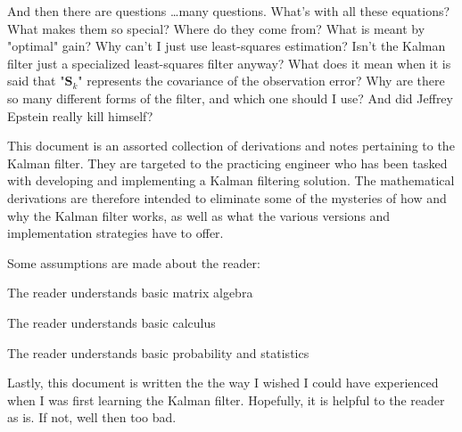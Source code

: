 And then there are questions \ldots many questions.
What’s with all these equations?
What makes them so special?
Where do they come from?
What is meant by "optimal" gain?
Why can’t I just use least-squares estimation?
Isn’t the Kalman filter just a specialized least-squares filter anyway?
What does it mean when it is said that "$\mathbf{S}_k$" represents the covariance of the observation error?
Why are there so many different forms of the filter, and which one should I use?
And did Jeffrey Epstein really kill himself?

This document is an assorted collection of derivations and notes pertaining to the Kalman
filter. They are targeted to the practicing engineer who has been tasked with developing
and implementing a Kalman filtering solution. The mathematical derivations are therefore
intended to eliminate some of the mysteries of how and why the Kalman filter works, as
well as what the various versions and implementation strategies have to offer.

Some assumptions are made about the reader:

\begin{myitemize}
    \item The reader understands basic matrix algebra
    \item The reader understands basic calculus
    \item The reader understands basic probability and statistics
\end{myitemize}

Lastly, this document is written the the way I wished I could have experienced when I was
first learning the Kalman filter. Hopefully, it is helpful to the reader as is.
If not, well then too bad.
